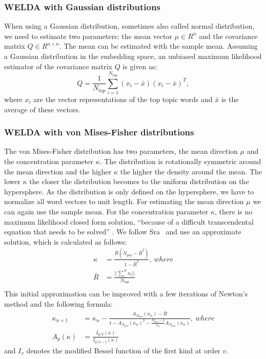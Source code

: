 \documentclass[
        a4paper,
        titlepage,
        twoside,
        parskip
        ]{scrbook}
\theoremstyle{break}
\begin{document}
\subsubsection{WELDA with Gaussian distributions}

When using a Gaussian distribution, sometimes also called normal distribution, we need to estimate two parameters: the mean vector $\mu \in R^n$ and the covariance matrix $Q \in R^{n \times n}$.
The mean can be estimated with the sample mean.
Assuming a Gaussian distribution in the embedding space, an unbiased maximum likelihood estimator of the covariance matrix $Q$ is given as:
\begin{equation*}
  Q = \frac{1}{N_{top}} \sum\limits_{i=1}^{N_{top}} (x_i - \bar{x}) (x_i - \bar{x})^T,
\end{equation*}
where $x_i$ are the vector representations of the top topic words and $\bar{x}$ is the average of these vectors.
\subsubsection{WELDA with von Mises-Fisher distributions}
The von Mises-Fisher distribution has two parameters, the mean direction $\mu$ and the concentration parameter $\kappa$.
The distribution is rotationally symmetric around the mean direction and the higher $\kappa$ the higher the density around the mean.
The lower $\kappa$ the closer the distribution becomes to the uniform distribution on the hypersphere.
As the distribution is only defined on the hypersphere, we have to normalize all word vectors to unit length.
For estimating the mean direction $\mu$ we can again use the sample mean.
For the concentration parameter $\kappa$, there is no maximum likelihood closed form solution, ``because of a difficult transcendental equation that needs to be solved'' \cite{Sra2012}.
We follow Sra~\cite{Sra2012} and use an approximate solution, which is calculated as follows:
\begin{align*}
  \kappa &= \frac{\bar{R}(N_{pca} - \bar{R}^2)}{1 - \bar{R}^2},~where \\
  \bar{R} &= \frac{|| \sum_{i}^{N} x_i ||}{N_{top}} \\
\end{align*}
This initial approximation can be improved with a few iterations of Newton's method and the following formula:
\begin{align*}
  \kappa_{n + 1} &= \kappa_n - \frac{A_{N_{pca}}(\kappa_n)-\bar{R}}{1-A_{N_{pca}}(\kappa_n)^2-\frac{N_{pca}-1}{\kappa_n}A_{N_{pca}}(\kappa_n)},~where \\
  A_{p}(\kappa) &= \frac {I_{p/2}(\kappa)} {I_{p/2-1}(\kappa)}
\end{align*}
and $I_{v}$ denotes the modified Bessel function of the first kind at order $v$.
\end{document}

